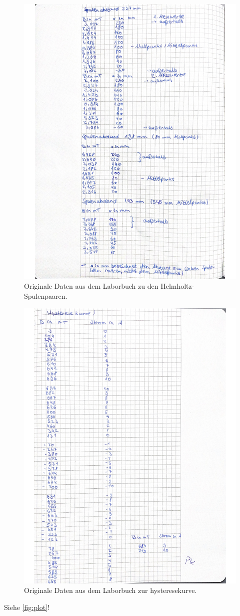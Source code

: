 \begin{figure}
  \centering
  \includegraphics{daten2.pdf}
  \caption{Originale Daten aus dem Laborbuch zu den Helmholtz-Spulenpaaren.}
  \label{fig:Daten2}
\end{figure}

\begin{figure}
  \centering
  \includegraphics{daten3.pdf}
  \caption{Originale Daten aus dem Laborbuch zur hysteresekurve.}
  \label{fig:Daten3}
\end{figure}


Siehe \autoref{fig:plot}!
